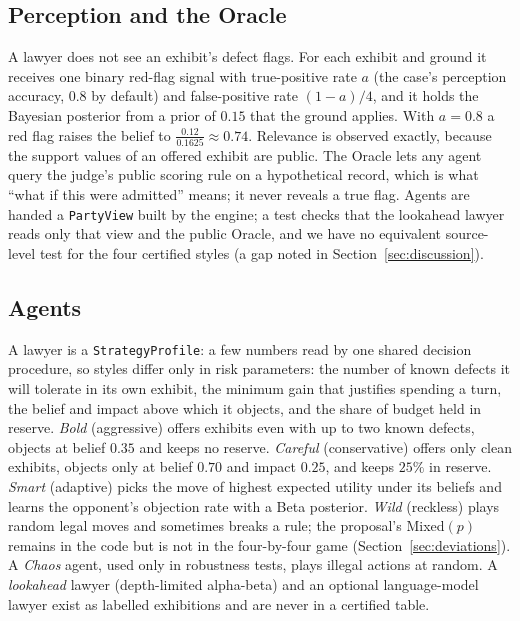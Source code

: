 \subsection{Perception and the Oracle}\label{sec:perception}
A lawyer does not see an exhibit's defect flags. For each exhibit and ground it receives one binary red-flag signal with true-positive rate $a$ (the case's perception accuracy, $0.8$ by default) and false-positive rate $(1-a)/4$, and it holds the Bayesian posterior from a prior of $0.15$ that the ground applies. With $a=0.8$ a red flag raises the belief to $\tfrac{0.12}{0.1625}\approx 0.74$. Relevance is observed exactly, because the support values of an offered exhibit are public. The Oracle lets any agent query the judge's public scoring rule on a hypothetical record, which is what ``what if this were admitted'' means; it never reveals a true flag. Agents are handed a \texttt{PartyView} built by the engine; a test checks that the lookahead lawyer reads only that view and the public Oracle, and we have no equivalent source-level test for the four certified styles (a gap noted in Section~\ref{sec:discussion}).

\subsection{Agents}
A lawyer is a \texttt{StrategyProfile}: a few numbers read by one shared decision procedure, so styles differ only in risk parameters: the number of known defects it will tolerate in its own exhibit, the minimum gain that justifies spending a turn, the belief and impact above which it objects, and the share of budget held in reserve. \emph{Bold} (aggressive) offers exhibits even with up to two known defects, objects at belief $0.35$ and keeps no reserve. \emph{Careful} (conservative) offers only clean exhibits, objects only at belief $0.70$ and impact $0.25$, and keeps $25\%$ in reserve. \emph{Smart} (adaptive) picks the move of highest expected utility under its beliefs and learns the opponent's objection rate with a Beta posterior. \emph{Wild} (reckless) plays random legal moves and sometimes breaks a rule; the proposal's Mixed$(p)$ remains in the code but is not in the four-by-four game (Section~\ref{sec:deviations}). A \emph{Chaos} agent, used only in robustness tests, plays illegal actions at random. A \emph{lookahead} lawyer (depth-limited alpha-beta) and an optional language-model lawyer exist as labelled exhibitions and are never in a certified table.

